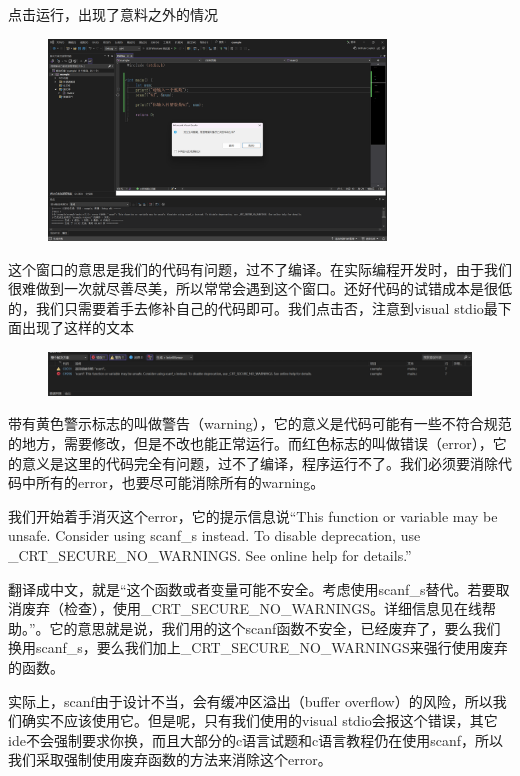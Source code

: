 点击运行，出现了意料之外的情况

\begin{figure}[ht]
    \centering
    \includegraphics[width=0.8\textwidth, height=0.4\textheight]{images/1标准输入报错.png}
\end{figure}

这个窗口的意思是我们的代码有问题，过不了编译。在实际编程开发时，由于我们很难做到一次就尽善尽美，所以常常会遇到这个窗口。还好代码的试错成本是很低的，我们只需要着手去修补自己的代码即可。我们点击否，注意到visual stdio最下面出现了这样的文本

\begin{figure}[ht]
    \centering
    \includegraphics[width=\textwidth, height=0.2\textheight]{images/1ide错误提示.png}
\end{figure}

带有黄色警示标志的叫做警告（warning），它的意义是代码可能有一些不符合规范的地方，需要修改，但是不改也能正常运行。而红色标志的叫做错误（error），它的意义是这里的代码完全有问题，过不了编译，程序运行不了。我们必须要消除代码中所有的error，也要尽可能消除所有的warning。

我们开始着手消灭这个error，它的提示信息说“This function or variable may be unsafe. Consider using scanf\_s instead. To disable deprecation, use \_CRT\_SECURE\_NO\_WARNINGS. See online help for details.”

翻译成中文，就是“这个函数或者变量可能不安全。考虑使用scanf\_s替代。若要取消废弃（检查），使用\_CRT\_SECURE\_NO\_WARNINGS。详细信息见在线帮助。”。它的意思就是说，我们用的这个scanf函数不安全，已经废弃了，要么我们换用scanf\_s，要么我们加上\_CRT\_SECURE\_NO\_WARNINGS来强行使用废弃的函数。

实际上，scanf由于设计不当，会有缓冲区溢出（buffer overflow）的风险，所以我们确实不应该使用它。但是呢，只有我们使用的visual stdio会报这个错误，其它ide不会强制要求你换，而且大部分的c语言试题和c语言教程仍在使用scanf，所以我们采取强制使用废弃函数的方法来消除这个error。

